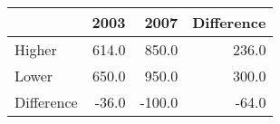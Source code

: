 \begin{tabular}{lrrr}
\toprule
{} &   2003 &   2007 &  Difference \\
\midrule
Higher     &  614.0 &  850.0 &       236.0 \\
Lower      &  650.0 &  950.0 &       300.0 \\
Difference &  -36.0 & -100.0 &       -64.0 \\
\bottomrule
\end{tabular}
